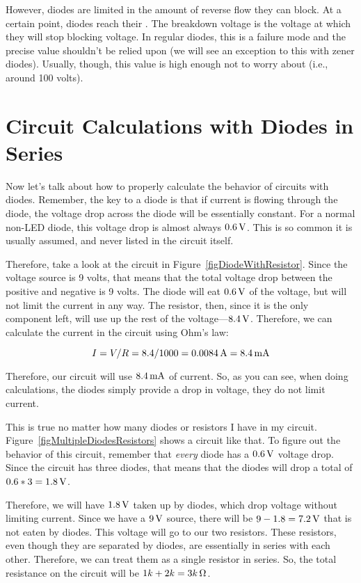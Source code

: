 However, diodes are limited in the amount of reverse flow they can block.
At a certain point, diodes reach their .
The breakdown voltage is the voltage at which they will stop blocking voltage.
In regular diodes, this is a failure mode and the precise value shouldn't be relied upon (we will see an exception to this with zener diodes). %
Usually, though, this value is high enough not to worry about (i.e., around 100 volts).

\section{Circuit Calculations with Diodes in Series}

Now let's talk about how to properly calculate the behavior of circuits with diodes.
Remember, the key to a diode is that if current is flowing through the diode, the voltage drop across the diode will be essentially constant.
For a normal non-LED diode, this voltage drop is almost always $0.6\,\si{\volt}$.
This is so common it is usually assumed, and never listed in the circuit itself.

Therefore, take a look at the circuit in Figure~\ref{figDiodeWithResistor}.
Since the voltage source is 9 volts, that means that the total voltage drop between the positive and negative is 9 volts.
The diode will eat $0.6\,\si{\volt}$ of the voltage, but will not limit the current in any way.
The resistor, then, since it is the only component left, will use up the rest of the voltage---$8.4\,\si{\volt}$.
Therefore, we can calculate the current in the circuit using Ohm's law:

$$I = V / R = 8.4 / 1000 = 0.0084\,\si{\ampere} = 8.4\,\si{\milli\ampere}$$


Therefore, our circuit will use $8.4\,\si{\milli\ampere}$ of current.
So, as you can see, when doing calculations, the diodes simply provide a drop in voltage, they do not limit current.

This is true no matter how many diodes or resistors I have in my circuit.
Figure~\ref{figMultipleDiodesResistors} shows a circuit like that.
To figure out the behavior of this circuit, remember that \emph{every} diode has a $0.6\,\si{\volt}$ voltage drop.  Since the circuit has three diodes, that means that the diodes will drop a total of $0.6 * 3 = 1.8\,\si{\volt}$.

Therefore, we will have $1.8\,\si{\volt}$ taken up by diodes, which drop voltage without limiting current.  
Since we have a $9\,\si{\volt}$ source, there will be $9 - 1.8 = 7.2\,\si{\volt}$ that is not eaten by diodes.
This voltage will go to our two resistors.  
These resistors, even though they are separated by diodes, are essentially in series with each other.
Therefore, we can treat them as a single resistor in series.
So, the total resistance on the circuit will be $1k + 2k = 3k\,\si{\ohm}$.

